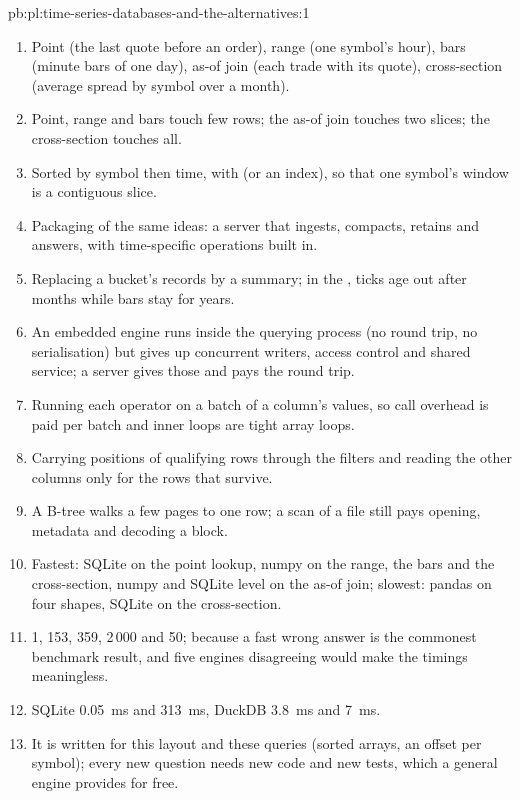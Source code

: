 \begin{solution}{pb:pl:time-series-databases-and-the-alternatives:1}
\begin{enumerate}
\item Point (the last quote before an order), range (one symbol's hour), bars (minute bars of one day), as-of join (each trade
with its quote), cross-section (average spread by symbol over a month).
\item Point, range and bars touch few rows; the as-of join touches two slices; the cross-section touches all.
\item Sorted by symbol then time, with  (or an index), so that one symbol's window is a contiguous slice.
\item Packaging of the same ideas: a server that ingests, compacts, retains and answers, with time-specific operations built in.
\item Replacing a bucket's records by a summary; in the , ticks age out after months while bars stay for years.
\item An embedded engine runs inside the querying process (no round trip, no serialisation) but gives up concurrent writers,
access control and shared service; a server gives those and pays the round trip.
\item Running each operator on a batch of a column's values, so call overhead is paid per batch and inner loops are tight array
loops.
\item Carrying positions of qualifying rows through the filters and reading the other columns only for the rows that survive.
\item A B-tree walks a few pages to one row; a scan of a file still pays opening, metadata and decoding a block.
\item Fastest: SQLite on the point lookup, numpy on the range, the bars and the cross-section, numpy and SQLite level on the as-of
join; slowest: pandas on four shapes, SQLite on the cross-section.
\item 1, 153, 359, 2\,000 and 50; because a fast wrong answer is the commonest benchmark result, and five engines disagreeing would
make the timings meaningless.
\item SQLite 0.05~ms and 313~ms, DuckDB 3.8~ms and 7~ms.
\item It is written for this layout and these queries (sorted arrays, an offset per symbol); every new question needs new code and
new tests, which a general engine provides for free.

\end{enumerate}
\end{solution}

